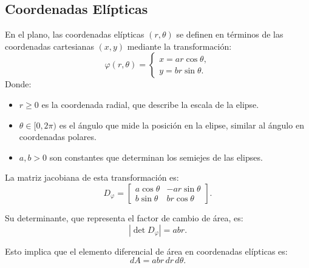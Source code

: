 \subsection{Coordenadas Elípticas}

\begin{definición}
En el plano, las coordenadas elípticas $(r, \theta)$ se definen en términos de las coordenadas cartesianas $(x, y)$ mediante la transformación:
$$
    \varphi (r, \theta) =
    \begin{cases}
        x = a r \cos\theta, \\
        y = b r \sin\theta.
    \end{cases}
$$
Donde:
\begin{itemize}
    \item $r \geq 0$ es la coordenada radial, que describe la escala de la elipse.
    \item $\theta \in [0, 2\pi)$ es el ángulo que mide la posición en la elipse, similar al ángulo en coordenadas polares.
    \item $a, b > 0$ son constantes que determinan los semiejes de las elipses.
\end{itemize}

La matriz jacobiana de esta transformación es: $$ D_\varphi =
    \begin{bmatrix}
        a\cos\theta & -a r \sin\theta \\
        b\sin\theta & b r \cos\theta
    \end{bmatrix}.
$$

Su determinante, que representa el factor de cambio de área, es: $$ \left| \det
    D_\varphi \right| = a b r. $$

Esto implica que el elemento diferencial de área en coordenadas elípticas es:
$$ dA = a b r \, dr \, d\theta. $$

\end{definición}

